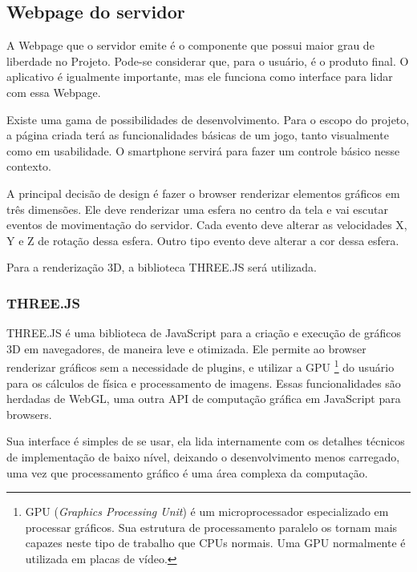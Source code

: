 \documentclass[a4paper,12pt]{article}
\begin{document}
\newpage
\subsection{Webpage do servidor}

A Webpage que o servidor emite é o componente que possui maior grau de liberdade no Projeto. Pode-se considerar que, para o usuário, é o produto final. O aplicativo é igualmente importante, mas ele funciona como interface para lidar com essa Webpage.

Existe uma gama de possibilidades de desenvolvimento. Para o escopo do projeto, a página criada terá as funcionalidades básicas de um jogo, tanto visualmente como em usabilidade. O smartphone servirá para fazer um controle básico nesse contexto.

A principal decisão de design é fazer o browser renderizar elementos gráficos em três dimensões. Ele deve renderizar uma esfera no centro da tela e vai escutar eventos de movimentação do servidor. Cada evento deve alterar as velocidades X, Y e Z de rotação dessa esfera. Outro tipo evento deve alterar a cor dessa esfera.%


Para a renderização 3D, a biblioteca THREE.JS será utilizada.


\subsubsection{THREE.JS}

THREE.JS é uma biblioteca de JavaScript para a criação e execução de gráficos 3D em navegadores, de maneira leve e otimizada. Ele permite ao browser renderizar gráficos sem a necessidade de plugins, e utilizar a GPU \footnote{GPU (\emph{Graphics Processing Unit}) é um microprocessador especializado em processar gráficos. Sua estrutura de processamento paralelo os tornam mais capazes neste tipo de trabalho que CPUs normais. Uma GPU normalmente é utilizada em placas de vídeo.} do usuário para os cálculos de física e processamento de imagens. Essas funcionalidades são herdadas de WebGL, uma outra API de computação gráfica em JavaScript para browsers.

Sua interface é simples de se usar, ela lida internamente com os detalhes técnicos de implementação de baixo nível, deixando o desenvolvimento menos carregado, uma vez que processamento gráfico é uma área complexa da computação.
\end{document}
